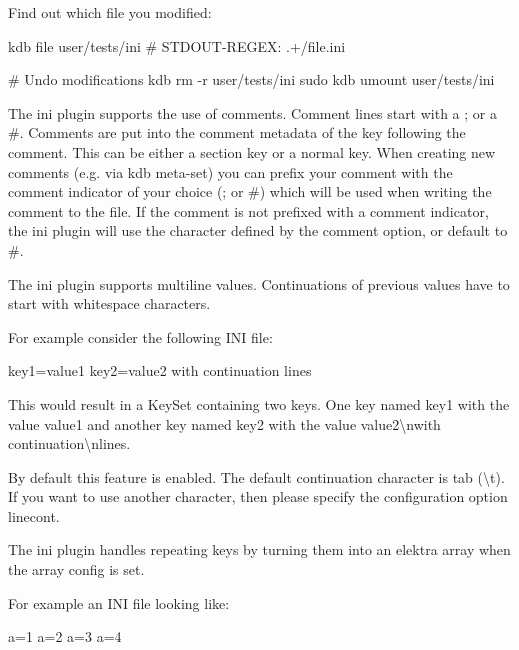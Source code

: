 Find out which file you modified\+:


\begin{DoxyCode}
kdb file user/tests/ini
# STDOUT-REGEX: .+/file.ini

# Undo modifications
kdb rm -r user/tests/ini
sudo kdb umount user/tests/ini
\end{DoxyCode}


The ini plugin supports the use of comments. Comment lines start with a \textquotesingle{};\textquotesingle{} or a \textquotesingle{}\#\textquotesingle{}. Comments are put into the comment metadata of the key following the comment. This can be either a section key or a normal key. When creating new comments (e.\+g. via {\ttfamily kdb meta-\/set}) you can prefix your comment with the comment indicator of your choice (\textquotesingle{};\textquotesingle{} or \textquotesingle{}\#\textquotesingle{}) which will be used when writing the comment to the file. If the comment is not prefixed with a comment indicator, the ini plugin will use the character defined by the {\ttfamily comment} option, or default to \textquotesingle{}\#\textquotesingle{}.

The ini plugin supports multiline values. Continuations of previous values have to start with whitespace characters.

For example consider the following I\+NI file\+:


\begin{DoxyCode}
key1=value1
key2=value2
        with continuation
        lines
\end{DoxyCode}


This would result in a Key\+Set containing two keys. One key named {\ttfamily key1} with the value {\ttfamily value1} and another key named {\ttfamily key2} with the value {\ttfamily value2\textbackslash{}nwith continuation\textbackslash{}nlines}.

By default this feature is enabled. The default continuation character is tab ({\ttfamily \textbackslash{}t}). If you want to use another character, then please specify the configuration option {\ttfamily linecont}.

The ini plugin handles repeating keys by turning them into an elektra array when the {\ttfamily array} config is set.

For example an I\+NI file looking like\+:


\begin{DoxyCode}
[sec]
a=1
a=2
a=3
a=4
\end{DoxyCode}


